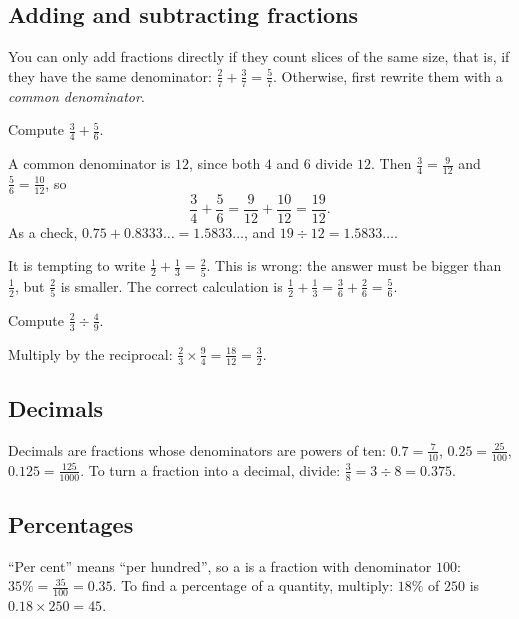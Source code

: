 \subsection{Adding and subtracting fractions}

You can only add fractions directly if they count slices of the same size,
that is, if they have the same denominator: $\tfrac{2}{7} + \tfrac{3}{7} =
\tfrac57$. Otherwise, first rewrite them with a \emph{common denominator}.

\begin{example}\label{ex:add-fractions}
Compute $\tfrac34 + \tfrac56$.

\sol A common denominator is $12$, since both $4$ and $6$ divide $12$. Then
$\tfrac34 = \tfrac{9}{12}$ and $\tfrac56 = \tfrac{10}{12}$, so
\[
  \frac34 + \frac56 = \frac{9}{12} + \frac{10}{12} = \frac{19}{12}.
\]
As a check, $0.75 + 0.8333\ldots = 1.5833\ldots$, and $19 \div 12 =
1.5833\ldots$.
\end{example}

\begin{pitfall}
It is tempting to write $\tfrac12 + \tfrac13 = \tfrac25$. This is wrong: the
answer must be bigger than $\tfrac12$, but $\tfrac25$ is smaller. The correct
calculation is $\tfrac12 + \tfrac13 = \tfrac36 + \tfrac26 = \tfrac56$.
\end{pitfall}

\begin{example}
Compute $\tfrac23 \div \tfrac49$.

\sol Multiply by the reciprocal:
$\tfrac23 \times \tfrac94 = \tfrac{18}{12} = \tfrac32$.
\end{example}

\subsection{Decimals}

Decimals are fractions whose denominators are powers of ten:
$0.7 = \tfrac{7}{10}$, $0.25 = \tfrac{25}{100}$, $0.125 = \tfrac{125}{1000}$.
To turn a fraction into a decimal, divide: $\tfrac38 = 3 \div 8 = 0.375$.

\subsection{Percentages}

``Per cent'' means ``per hundred'', so a  is a fraction with
denominator $100$: $35\% = \tfrac{35}{100} = 0.35$. To find a percentage of a
quantity, multiply: $18\%$ of $250$ is $0.18 \times 250 = 45$.

